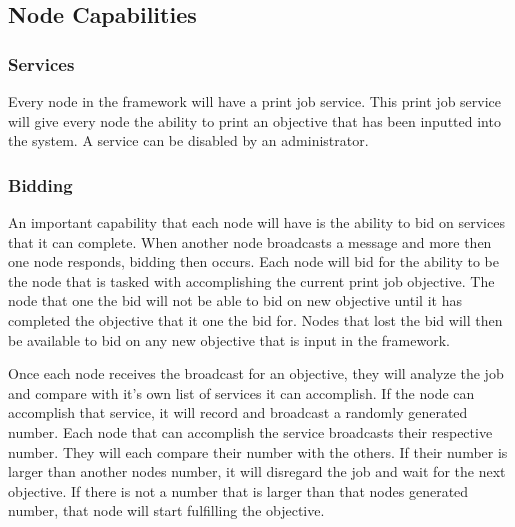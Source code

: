 \documentclass[draftclsnofoot, onecolumn, compsoc, 10pt]{IEEEtran}
\begin{document}


\subsection{Node Capabilities}
\subsubsection{Services}
Every node in the framework will have a print job service. This print job service will give every node the ability to print an objective that has been inputted into the system. A service can be disabled by an administrator.

\subsubsection{Bidding}
An important capability that each node will have is the ability to bid on services that it can complete. When another node broadcasts a message and more then one node responds, bidding then occurs. Each node will bid for the ability to be the node that is tasked with accomplishing the current print job objective. The node that one the bid will not be able to bid on new objective until it has completed the objective that it one the bid for. Nodes that lost the bid will then be available to bid on any new objective that is input in the framework.

Once each node receives the broadcast for an objective, they will analyze the job and compare with it's own list of services it can accomplish. If the node can accomplish that service, it will record and broadcast a randomly generated number. Each node that can accomplish the service broadcasts their respective number. They will each compare their number with the others. If their number is larger than another nodes number, it will disregard the job and wait for the next objective. If there is not a number that is larger than that nodes generated number, that node will start fulfilling the objective.
\end{document}
